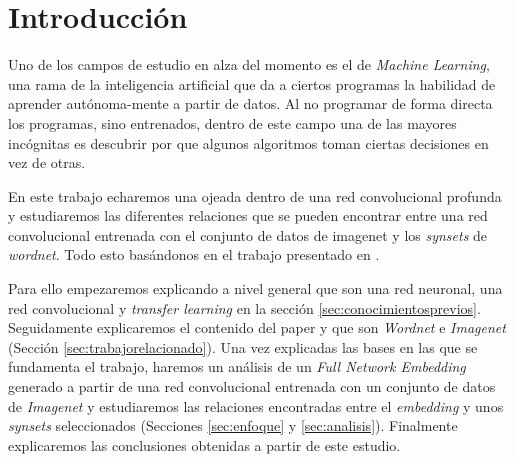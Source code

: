 \documentclass[12,twoside]{TFG-GM}
\theoremstyle{definition}
\theoremstyle{remark}
\begin{document}


\maketitle

\tableofcontents
\newpage

\section{Introducción}

Uno de los campos de estudio en alza del momento es el de \textit{Machine Learning}, una rama de la inteligencia artificial que da a ciertos programas la habilidad de aprender autónoma-mente a partir de datos. Al no programar de forma directa los programas, sino entrenados, dentro de este campo una de las mayores incógnitas es descubrir por que algunos algoritmos toman ciertas decisiones en vez de otras. 

En este trabajo echaremos una ojeada dentro de una red convolucional profunda y estudiaremos las diferentes relaciones que se pueden encontrar entre una red convolucional entrenada con el conjunto de datos de imagenet y los \textit{synsets} de \textit{wordnet}.
Todo esto basándonos en el trabajo presentado en \cite{fne}.  

Para ello empezaremos explicando a nivel general que son una red neuronal, una red convolucional y \textit{transfer learning} en la sección \ref{sec:conocimientosprevios}. Seguidamente explicaremos el contenido del paper \cite{fne} y que son \textit{Wordnet} e \textit{Imagenet} (Sección \ref{sec:trabajorelacionado}).
Una vez explicadas las bases en las que se fundamenta el trabajo, haremos un análisis de un \textit{Full Network Embedding} generado a partir de una red convolucional entrenada con un conjunto de datos de \textit{Imagenet} y estudiaremos las relaciones encontradas entre el \textit{embedding} y unos \textit{synsets} seleccionados (Secciones \ref{sec:enfoque} y \ref{sec:analisis}). Finalmente explicaremos las conclusiones obtenidas a partir de este estudio.    
\end{document}
